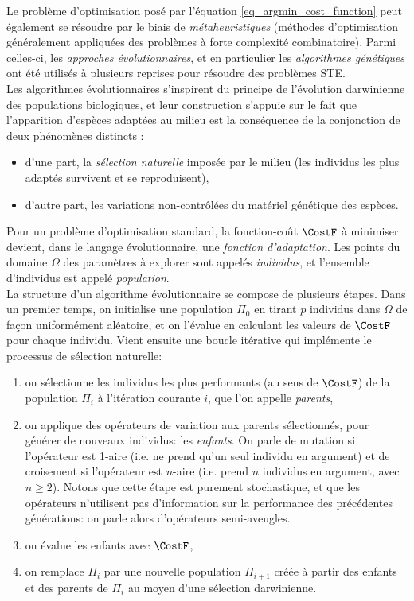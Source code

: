  Le problème d'optimisation posé par l'équation \eqref{eq_argmin_cost_function} peut également se résoudre par le biais de \textit{métaheuristiques} (méthodes d'optimisation généralement appliquées des problèmes à forte complexité combinatoire). Parmi celles-ci, les \textit{approches évolutionnaires}, et en particulier les \textit{algorithmes génétiques} ont été utilisés à plusieurs reprises pour résoudre des problèmes STE.\\
 
Les algorithmes évolutionnaires s'inspirent du principe de l'évolution darwinienne des populations biologiques, et leur construction s'appuie sur le fait que l'apparition d'espèces adaptées au milieu est la conséquence de la conjonction de deux phénomènes distincts : 

 \begin{itemize}
 	\item d'une part, la \textit{sélection naturelle} imposée par le milieu (les individus les plus adaptés survivent et se reproduisent),
 	\item d'autre part, les variations non-contrôlées du matériel génétique des espèces.
 \end{itemize}
 
 Pour un problème d'optimisation standard, la fonction-coût $\CostF$ à minimiser devient, dans le langage évolutionnaire, une \textit{fonction d'adaptation}. Les points du domaine $\Omega$ des paramètres à explorer sont appelés \textit{individus}, et l'ensemble d'individus est appelé \textit{population}. \\
 
 La structure d'un algorithme évolutionnaire se compose de plusieurs étapes. Dans un premier temps, on initialise une population $\Pi_0$ en tirant $p$ individus dans $\Omega$ de façon uniformément aléatoire, et on l'évalue en calculant les valeurs de $\CostF$ pour chaque individu. Vient ensuite une boucle itérative qui implémente le processus de sélection naturelle:
 \begin{enumerate}
 	\item on sélectionne les individus les plus performants (au sens de $\CostF$) de la population $\Pi_i$ à l'itération courante $i$, que l'on appelle \textit{parents},
 	\item on applique des opérateurs de variation aux parents sélectionnés, pour générer de nouveaux individus: les \textit{enfants}. On parle de mutation si l'opérateur est 1-aire (i.e. ne prend qu'un seul individu en argument) et de croisement si l'opérateur est $n$-aire (i.e. prend $n$ individus en argument, avec $n \geq 2$). Notons que cette étape est purement stochastique, et que les opérateurs n'utilisent pas d'information sur la performance des précédentes générations: on parle alors d'opérateurs semi-aveugles.
 	\item on évalue les enfants avec $\CostF$,
 	\item on remplace $\Pi_i$  par une nouvelle population $\Pi_{i+1}$ créée à partir des enfants et des parents de $\Pi_i$ au moyen d'une sélection darwinienne.\\
 \end{enumerate}
 
